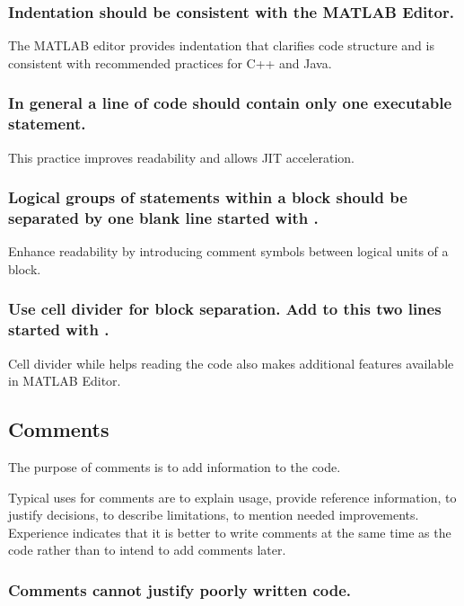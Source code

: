 \documentclass[titlepage,a4paper,12pt]{article}
\begin{document}
\subsubsection{Indentation should be consistent with the MATLAB
Editor.}
 The MATLAB
editor provides indentation that clarifies code structure and is
consistent with recommended practices for C++ and Java.

\subsubsection{In general a line of code should contain only one executable
statement.}
 This practice improves readability and allows JIT
acceleration.



\subsubsection{Logical groups of statements within a block should be separated by
one blank line started with \textmcode{\%}.}

 Enhance readability by introducing comment symbols
between logical units of a block.

\subsubsection{Use cell divider \textmcode{\%\%} for block separation. Add to this two lines
started with \textmcode{\%}.}
Cell divider \textmcode{\%\%} while helps reading the code also makes additional features available in MATLAB Editor.

\subsection{Comments}

 The purpose of comments is to add information to the code.

Typical uses for comments are to explain usage, provide reference
information, to justify decisions, to describe limitations, to
mention needed improvements. Experience indicates that it is better
to write comments at the same time as the code rather than to intend
to add comments later.

\subsubsection{Comments cannot justify poorly written code.}
\end{document}
